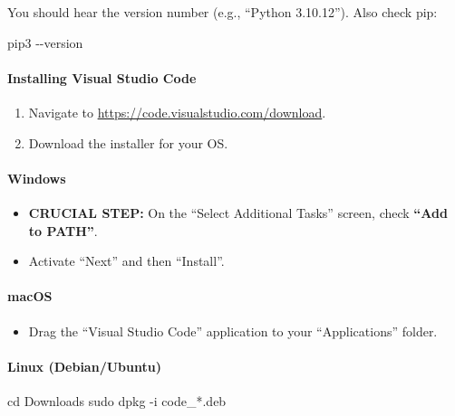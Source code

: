 \documentclass[
  justified,
  openright,
]{tufte-book}
\let\subsection\paragraph
\let\paragraph\paragraph
\newcommand{\CodeFuncTok}[1]{\textcolor{CodeKeyword}{#1}}           %
\newcommand{\CodeTypeTok}[1]{\textcolor{CodeType}{#1}}              %
\newcommand{\CodeAccentTok}[1]{\textcolor{CodeAccent}{#1}}          %
\newenvironment{Shaded}{%
  \begin{mdframed}[style=TufteCode]%
}{%
  \end{mdframed}%
}
\let\subsection\paragraph
\let\paragraph\paragraph
\providecommand{\tightlist}{%
  \setlength{\itemsep}{0pt}\setlength{\parskip}{0pt}}
\begin{document}
You should hear the version number (e.g., ``Python 3.10.12''). Also
check pip:

\begin{Shaded}
\begin{Highlighting}[]
pip3 \CodeTypeTok{{-}{-}version}
\end{Highlighting}
\end{Shaded}

\subsection{Installing Visual Studio
Code}\label{installing-visual-studio-code}

\begin{enumerate}
\def\labelenumi{\arabic{enumi}.}
\tightlist
\item
  Navigate to \url{https://code.visualstudio.com/download}.
\item
  Download the installer for your OS.
\end{enumerate}

\paragraph{Windows}\label{windows-1}

\begin{itemize}
\tightlist
\item
  \textbf{CRUCIAL STEP:} On the ``Select Additional Tasks'' screen,
  check \textbf{``Add to PATH''}.
\item
  Activate ``Next'' and then ``Install''.
\end{itemize}

\paragraph{macOS}\label{macos-1}

\begin{itemize}
\tightlist
\item
  Drag the ``Visual Studio Code'' application to your ``Applications''
  folder.
\end{itemize}

\paragraph{Linux (Debian/Ubuntu)}\label{linux-debianubuntu}

\begin{Shaded}
\begin{Highlighting}[]
cd Downloads
\CodeFuncTok{sudo} dpkg \CodeTypeTok{{-}i} code\_\CodeAccentTok{*}.deb
\end{Highlighting}
\end{Shaded}
\end{document}
